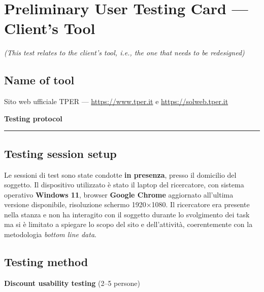 ﻿\documentclass[11pt,a4paper]{article}
\begin{document}
\newpage

\section{Preliminary User Testing Card --- Client's Tool}
\textit{(This test relates to the client's tool, i.e., the one that needs to be redesigned)}

\vspace{0.2cm}

\subsection*{Name of tool}
\begin{tcolorbox}[base]
Sito web ufficiale TPER --- \url{https://www.tper.it} e \url{https://solweb.tper.it}
\end{tcolorbox}

\vspace{0.2cm}

\begin{center}
  {\color{primaryColor}\large\bfseries Testing protocol}
  \vspace{0.1cm}
  \color{borderColor}\hrule
\end{center}

\vspace{0.2cm}

\subsection*{Testing session setup}
\begin{tcolorbox}[base]
Le sessioni di test sono state condotte \textbf{in presenza},
presso il domicilio del soggetto. Il dispositivo utilizzato è
stato il laptop del ricercatore, con sistema operativo
\textbf{Windows 11}, browser \textbf{Google Chrome} aggiornato
all'ultima versione disponibile, risoluzione schermo 1920×1080.
Il ricercatore era presente nella stanza e non ha interagito
con il soggetto durante lo svolgimento dei task ma si è limitato a spiegare lo scopo del sito e dell'attività, coerentemente
con la metodologia \textit{bottom line data}.
\end{tcolorbox}

\vspace{0.2cm}

\subsection*{Testing method}
\textbf{Discount usability testing} (2--5 persone)
\end{document}
